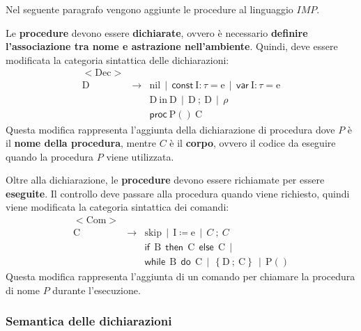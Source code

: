 \documentclass[a4paper]{article}
\begin{document}
	Nel seguente paragrafo vengono aggiunte le procedure al linguaggio $IMP$.\newline
	
	\noindent
	Le \textbf{procedure} devono essere \textbf{dichiarate}, ovvero è necessario \textbf{definire l'associazione tra nome e astrazione nell'ambiente}. Quindi, deve essere modificata la categoria sintattica delle dichiarazioni:
	\begin{equation*}
		\begin{array}{rll}
			\mathrm{<Dec>} & & \\
			\mathrm{D} & \rightarrow & \mathrm{nil} \:\: | \:\: \textsf{const} \: \mathrm{I}:\tau = \mathrm{e} \:\: | \:\: \textsf{var} \: \mathrm{I} : \tau = \mathrm{e} \\
			&& \mathrm{D} \: \mathrm{in} \: \mathrm{D} \:\: | \:\: \mathrm{D} \: ; \: \mathrm{D} \:\: | \:\: \rho \\
			&& \textsf{proc} \: \mathrm{P()} \: \mathrm{C}
		\end{array}
	\end{equation*}
	Questa modifica rappresenta l'aggiunta della dichiarazione di procedura dove $P$ è il \textbf{nome della procedura}, mentre $C$ è il \textbf{corpo}, ovvero il codice da eseguire quando la procedura $P$ viene utilizzata.\newline
	
	\noindent
	Oltre alla dichiarazione, le \textbf{procedure} devono essere richiamate per essere \textbf{eseguite}. Il controllo deve passare alla procedura quando viene richiesto, quindi viene modificata la categoria sintattica dei comandi:
	\begin{equation*}
		\begin{array}{rll}
			\mathrm{<Com>} & & \\
			\mathrm{C} & \rightarrow & \mathrm{skip} \:\: | \:\: \mathrm{I} \coloneq \mathrm{e} \:\: | \:\: C \: ; \: C \:\: \\
			&& \textsf{if} \:\: \mathrm{B} \:\: \textsf{then} \:\: \mathrm{C} \:\: \textsf{else} \:\: \mathrm{C} \:\: | \\
			&& \textsf{while} \:\: \mathrm{B} \:\: \textsf{do} \:\: \mathrm{C} \:\: | \:\: \left\{\mathrm{D \: ; \: \mathrm{C}}\right\} \:\: | \:\: \mathrm{P()}
		\end{array}
	\end{equation*}
	Questa modifica rappresenta l'aggiunta di un comando per chiamare la procedura di nome $P$ durante l'esecuzione.\newpage
	
	\subsubsection{Semantica delle dichiarazioni}
	
\end{document}
